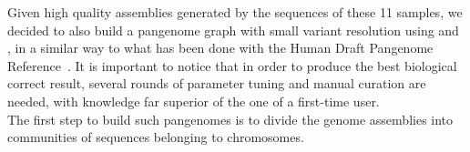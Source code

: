 Given high quality assemblies generated by the sequences of these 11 samples, we decided to also build a pangenome graph with small variant resolution using \pggb and \mcactus, in a similar way to what has been done with the Human Draft Pangenome Reference~\cite{hdpr}. It is important to notice that in order to produce the best biological correct result, several rounds of parameter tuning and manual curation are needed, with knowledge far superior of the one of a first-time user.\\
The first step to build such pangenomes is to divide the genome assemblies into communities of sequences belonging to chromosomes.


